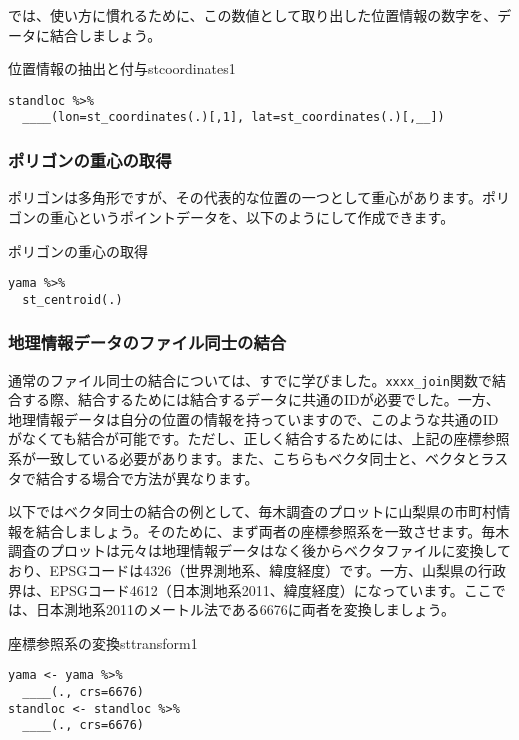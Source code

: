 では、使い方に慣れるために、この数値として取り出した位置情報の数字を、データに結合しましょう。
\begin{exercise}{位置情報の抽出と付与}{stcoordinates1}
\begin{verbatim}
standloc %>%
  ____(lon=st_coordinates(.)[,1], lat=st_coordinates(.)[,__])
\end{verbatim}
\end{exercise}


\subsubsection{ポリゴンの重心の取得}
ポリゴンは多角形ですが、その代表的な位置の一つとして重心があります。ポリゴンの重心というポイントデータを、以下のようにして作成できます。
\begin{itembox}[l]{ポリゴンの重心の取得}
\begin{verbatim}
yama %>%
  st_centroid(.)
\end{verbatim}
\end{itembox}

\subsubsection{地理情報データのファイル同士の結合}
通常のファイル同士の結合については、すでに学びました。\verb|xxxx_join|関数で結合する際、結合するためには結合するデータに共通のIDが必要でした。一方、地理情報データは自分の位置の情報を持っていますので、このような共通のIDがなくても結合が可能です。ただし、正しく結合するためには、上記の座標参照系が一致している必要があります。また、こちらもベクタ同士と、ベクタとラスタで結合する場合で方法が異なります。

以下ではベクタ同士の結合の例として、毎木調査のプロットに山梨県の市町村情報を結合しましょう。そのために、まず両者の座標参照系を一致させます。毎木調査のプロットは元々は地理情報データはなく後からベクタファイルに変換しており、EPSGコードは4326（世界測地系、緯度経度）です。一方、山梨県の行政界は、EPSGコード4612（日本測地系2011、緯度経度）になっています。ここでは、日本測地系2011のメートル法である6676に両者を変換しましょう。
\begin{exercise}{座標参照系の変換}{sttransform1}
\begin{verbatim}
yama <- yama %>%
  ____(., crs=6676)
standloc <- standloc %>%
  ____(., crs=6676)
\end{verbatim}
\end{exercise}


